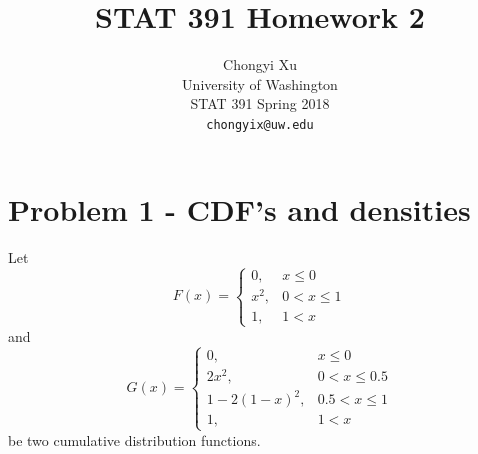 \documentclass[preprint,12pt]{elsarticle}
\begin{document}
    \title{\LARGE \bf
        STAT 391 Homework 2
        }
        
        \author{ \parbox{3 in}{\centering Chongyi Xu \\
                 University of Washington\\
                 STAT 391 Spring 2018\\
                 {\tt\small chongyix@uw.edu}}
        }
    \maketitle

    \section{Problem 1 - CDF's and densities}
    Let
    \begin{equation*}
        F(x) = 
        \begin{cases}
            0,  &x\leq 0\\
            x^2, &0<x\leq 1\\
            1,  &1<x
        \end{cases}
    \end{equation*}
    and
    \begin{equation*}
        G(x) =
        \begin{cases}
            0,          &x\leq 0\\
            2x^2,       &0<x\leq 0.5\\
            1-2(1-x)^2, &0.5<x\leq 1\\
            1,          &1<x
        \end{cases}
    \end{equation*}
    be two cumulative distribution functions.
\end{document}
